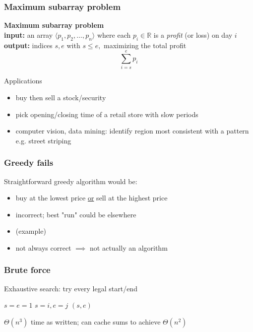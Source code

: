 \documentclass{beamer}
\begin{document}
\begin{frame} \frametitle{Maximum subarray problem}
  \textbf{Maximum subarray problem} \\
  \textbf{input: } an array $\langle p_1, p_2, \ldots, p_n \rangle$ where each
    $p_i \in \mathbb{R}$ is a \emph{profit} (or loss) on day $i$ \\
  \textbf{output: } indices $s, e$ with $s \leq e,$ maximizing the total profit
    \[ \sum_{i=s}^e p_i \]

  Applications
  \begin{itemize}
    \item buy then sell a stock/security
    \item pick opening/closing time of a retail store with slow periods
    \item computer vision, data mining: identify region most consistent with
      a pattern e.g. street striping
  \end{itemize}
\end{frame}

\begin{frame} \frametitle{Greedy fails}
  Straightforward greedy algorithm would be:
  \begin{itemize}
    \item buy at the lowest price \underline{or} sell at the highest price
    \item incorrect; best "run" could be elsewhere
    \item (example)
    \item not always correct $\implies$ not actually an algorithm
  \end{itemize}

\end{frame}

\begin{frame} \frametitle{Brute force}
  Exhaustive search: try every legal start/end

  \begin{algorithmic}[1]
    \State $s = e = 1$
          \State $s=i, e=j$
        \EndIf
      \EndFor
    \EndFor
    \State \Return $(s, e)$
    \EndFunction
  \end{algorithmic}

  $\Theta(n^3)$ time as written; can cache sums to achieve
  $\Theta(n^2)$

\end{frame}
\end{document}
